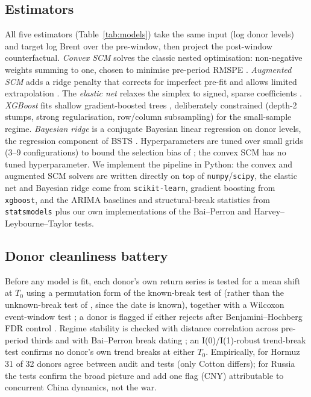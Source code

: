 \documentclass[11pt,a4paper]{article}
\begin{document}
\subsection{Estimators}
All five estimators (Table~\ref{tab:models}) take the same input (log donor levels) and
target log Brent over the pre-window, then project the post-window counterfactual.
\emph{Convex SCM} solves the classic nested optimisation: non-negative weights summing
to one, chosen to minimise pre-period RMSPE \citep{abadie2010}. \emph{Augmented SCM}
adds a ridge penalty that corrects for imperfect pre-fit and allows limited
extrapolation \citep{benmichael2021}. The \emph{elastic net} relaxes the simplex to
signed, sparse coefficients \citep{zouhastie2005,doudchenko2016}. \emph{XGBoost} fits
shallow gradient-boosted trees \citep{chenguestrin2016}, deliberately constrained
(depth-2 stumps, strong regularisation, row/column subsampling) for the small-sample
regime. \emph{Bayesian ridge} is a conjugate Bayesian linear regression on donor levels,
the regression component of BSTS \citep{brodersen2015}. Hyperparameters are tuned over
small grids (3--9 configurations) to bound the selection bias of \citet{cawley2010}; the
convex SCM has no tuned hyperparameter. We implement the pipeline in Python: the convex
and augmented SCM solvers are written directly on top of \texttt{numpy}/\texttt{scipy},
the elastic net and Bayesian ridge come from \texttt{scikit-learn}, gradient boosting
from \texttt{xgboost}, and the ARIMA baselines and structural-break statistics from
\texttt{statsmodels} plus our own implementations of the Bai--Perron and
Harvey--Leybourne--Taylor tests.

\subsection{Donor cleanliness battery}
Before any model is fit, each donor's own return series is tested for a mean shift at
$T_0$ using a permutation form of the known-break test of \citet{chow1960} (rather than
the unknown-break test of \citet{andrews1993}, since the date is known), together with a
Wilcoxon event-window test \citep{brownwarner1985}; a donor is flagged if either rejects
after Benjamini--Hochberg FDR control \citep{benjaminihochberg1995}. Regime stability is
checked with distance correlation across pre-period thirds \citep{szekely2007} and with
Bai--Perron break dating \citep{baiperron1998,baiperron2003}; an I(0)/I(1)-robust
trend-break test \citep{harvey2009,kpss1992} confirms no donor's own trend breaks at
either $T_0$. Empirically, for Hormuz 31 of 32 donors agree between audit and tests
(only Cotton differs); for Russia the tests confirm the broad picture and add one flag
(CNY) attributable to concurrent China dynamics, not the war.
\end{document}
